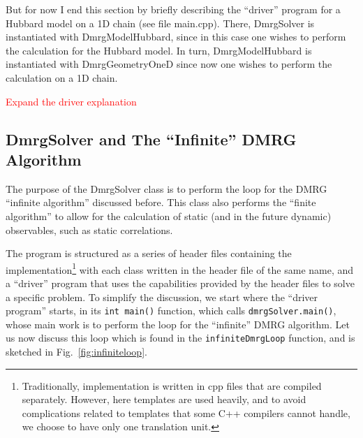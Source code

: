 \documentclass[paper=letter]{scrartcl}
\newcommand{\todo}[1]{\textcolor{red}{#1}}
\newcommand{\cppClass}[1]{{\sffamily #1}}
\newcommand{\cppFunction}[1]{{\tt #1}}
\begin{document}
But for now I end this section by briefly describing the ``driver'' program  for a Hubbard model on a 1D chain (see file main.cpp).
There, \cppClass{DmrgSolver} is instantiated with \cppClass{DmrgModelHubbard}, since in this case one wishes to perform the calculation for the Hubbard model.
In turn, \cppClass{DmrgModelHubbard}  is instantiated with  \cppClass{DmrgGeometryOneD} since now one wishes to perform the calculation on a 1D chain.

\todo{Expand the driver explanation}

\subsection{DmrgSolver and The ``Infinite'' DMRG Algorithm}
The purpose of the \cppClass{DmrgSolver} class is to perform  the loop for the DMRG ``infinite algorithm'' discussed before.
This class  also performs  
the ``finite algorithm''  \cite{re:schollwock05} to allow for the calculation of static (and in the future dynamic) 
observables, such as static correlations.

The program is structured as a series of header files containing the 
implementation\footnote{Traditionally, implementation is written in cpp files that are compiled separately. However, here templates
are used heavily, and to avoid complications related to templates that some C++ compilers cannot handle,
 we choose to have only one translation unit.} with each class written in the header file of the same name, 
 and a ``driver'' program that uses the
capabilities provided by the header files to solve a specific problem.
To simplify the discussion, we start where the ``driver program'' starts, in its \cppFunction{int main()} function, 
which calls \cppFunction{dmrgSolver.main()}, whose main work is to perform  the loop for the 
``infinite'' DMRG algorithm. Let us now discuss this loop which is found in the \cppFunction{infiniteDmrgLoop} function, 
and is sketched in Fig.~\ref{fig:infiniteloop}.
\end{document}
